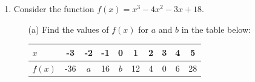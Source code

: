 \documentclass[12pt, oneside]{article}
\begin{document}
\begin{enumerate}
\item Consider the function $f(x) = x^3 - 4x^2 - 3x + 18$.
\begin{itemize}
    \item[(a)] Find the values of $f(x)$ for $a$ and $b$ in the table below:\\
	\begin{tabular}{|l|c|c|c|c|c|c|c|c|c|}
	\hline
	$x$ & -3 & -2 & -1 & 0 & 1 & 2 & 3 & 4 & 5\\
	\hline
    $f(x)$ & -36 & $a$ & 16 & $b$ & 12 & 4 & 0 & 6 & 28\\
	\hline
	\end{tabular}
\end{itemize}

\end{enumerate}
\end{document}
